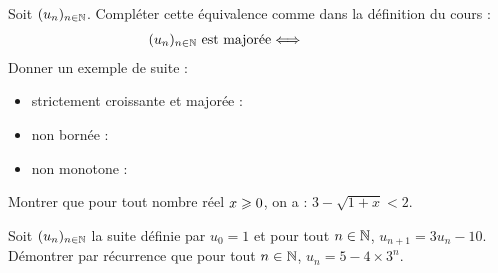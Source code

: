 \documentclass[a4paper,11pt,DIV10,BCOR0mm]{scrartcl}
\begin{document}
\begin{exercice}
Soit $(u_n)_{n\in\mathbb{N}}$. Compléter cette équivalence comme dans la définition du cours :
\begin{align*}
(u_n)_{n\in\mathbb{N}}\text{ est majorée}\Longleftrightarrow&&&&&&&&&
\end{align*}
Donner un exemple de suite :
\begin{itemize}
  \item strictement croissante et majorée :
  \item non bornée :
  \item non monotone :
\end{itemize}
\end{exercice}

\begin{exercice}
Montrer que pour tout nombre réel $x\geqslant 0$, on a : $3-\sqrt{1+x}\less 2$.
\end{exercice}
\vfill


\begin{exercice}
Soit $(u_n)_{n\in\mathbb{N}}$ la suite définie par $u_0=1$ et pour tout $n\in\mathbb{N}$, 
$u_{n+1}=3u_n-10$. Démontrer par récurrence que pour tout $n\in\mathbb{N}$,
$u_n=5-4\times 3^n$.
\end{exercice}
\vfill
\end{document}

